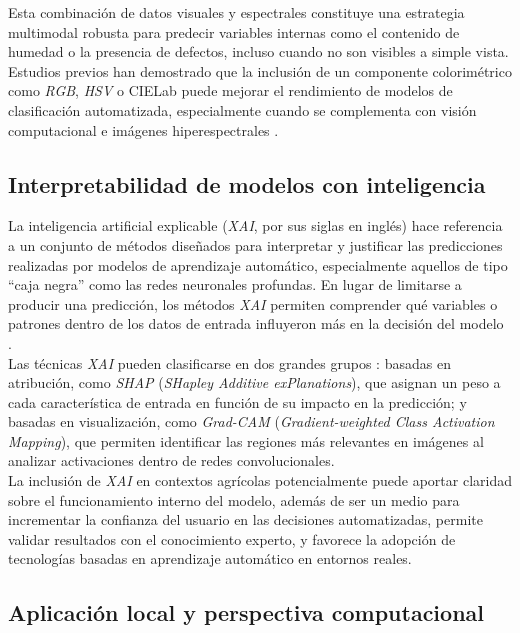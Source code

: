 Esta combinación de datos visuales y espectrales constituye una estrategia multimodal robusta para predecir variables internas como el contenido de humedad o la presencia de defectos, incluso cuando no son visibles a simple vista. Estudios previos han demostrado que la inclusión de un componente colorimétrico como \textit{RGB}, \textit{HSV} o CIELab puede mejorar el rendimiento de modelos de clasificación automatizada, especialmente cuando se complementa con visión computacional e imágenes hiperespectrales \parencite{gupta_fruit_2024, ahmed_comprehensive_2025, jayasooriya_assessing_2025}.

\subsection{Interpretabilidad de modelos con inteligencia}

La inteligencia artificial explicable (\textit{XAI}, por sus siglas en inglés) hace referencia a un conjunto de métodos diseñados para interpretar y justificar las predicciones realizadas por modelos de aprendizaje automático, especialmente aquellos de tipo ``caja negra'' como las redes neuronales profundas. En lugar de limitarse a producir una predicción, los métodos \textit{XAI} permiten comprender qué variables o patrones dentro de los datos de entrada influyeron más en la decisión del modelo \parencite{lundberg_unified_2017}.\\

Las técnicas \textit{XAI} pueden clasificarse en dos grandes grupos \parencite{upadhyay_artificial_2025}: basadas en atribución, como \textit{SHAP} (\textit{SHapley Additive exPlanations}), que asignan un peso a cada característica de entrada en función de su impacto en la predicción; y basadas en visualización, como \textit{Grad-CAM} (\textit{Gradient-weighted Class Activation Mapping}), que permiten identificar las regiones más relevantes en imágenes al analizar activaciones dentro de redes convolucionales.\\

La inclusión de \textit{XAI} en contextos agrícolas potencialmente puede aportar claridad sobre el funcionamiento interno del modelo, además de ser un medio para incrementar la confianza del usuario en las decisiones automatizadas, permite validar resultados con el conocimiento experto, y favorece la adopción de tecnologías basadas en aprendizaje automático en entornos reales.

\subsection{Aplicación local y perspectiva computacional}

